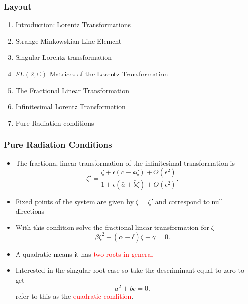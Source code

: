\documentclass[10pt,a4paper]{beamer}
\begin{document}
\begin{frame}
\frametitle{Layout}
\begin{enumerate}
\item<1>{Introduction: Lorentz Transformations}
\item<1>{Strange Minkowskian Line Element}
\item<1>{Singular Lorentz transformation}
\item<1>{$SL(2,\mathbb{C})$ Matrices of the Lorentz Transformation}
\item<1>{The Fractional Linear Transformation}
\item<1>{Infinitesimal Lorentz Transformation}
\item<1>{Pure Radiation conditions}
\end{enumerate}
\end{frame}


\begin{frame}
\frametitle{Pure Radiation Conditions}
\begin{itemize}
\item<1->{The fractional linear transformation of the infinitesimal transformation is
\begin{equation*}
\zeta' = \frac{\zeta + \epsilon(\bar{c} - \bar{a}\zeta) + O(\epsilon^2)}{1 + \epsilon(\bar{a} + \bar{b} \zeta) + O(\epsilon^2)}.
\end{equation*}}
\item<2->{Fixed points of the system are given by $\zeta = \zeta'$ and correspond to null directions}
\item<3->{With this condition solve the fractional linear transformation for $\zeta$ $$\bar{\beta}\zeta^2 + (\bar{\alpha}- \bar{\delta})\zeta - \bar{\gamma} = 0.$$}
\item<4->{A quadratic means it has \textcolor{red}{two roots in general}}
\item<5->{Interested in the singular root case so take the descriminant equal to zero to get
\begin{equation*}
a^2 +bc = 0.
\end{equation*}
\noindent refer to this as the \textcolor{red}{quadratic condition}.}
\end{itemize}

\end{frame}
\end{document}
